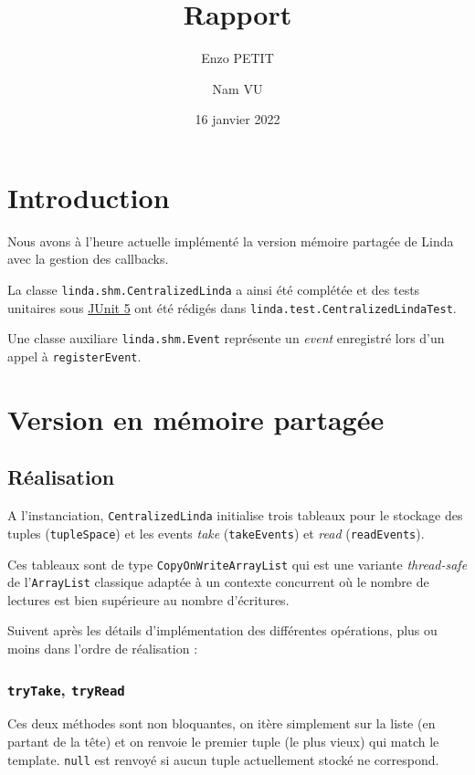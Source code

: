 \documentclass[headings=standardclasses,parskip=half]{scrartcl}
\title{Rapport}
\subtitle{}
\author{Enzo PETIT \and Nam VU}
\date{16 janvier 2022}
\begin{document}
\maketitle

\newpage

\tableofcontents

\newpage

\section{Introduction}

Nous avons à l'heure actuelle implémenté la version mémoire partagée
de Linda avec la gestion des callbacks.

La classe \texttt{linda.shm.CentralizedLinda} a ainsi été complétée et
des tests unitaires sous \href{https://junit.org/junit5/}{JUnit 5}
ont été rédigés dans \texttt{linda.test.CentralizedLindaTest}.

Une classe auxiliare \texttt{linda.shm.Event} représente un
\emph{event} enregistré lors d'un appel à \texttt{registerEvent}.

\section{Version en mémoire partagée}

\subsection{Réalisation}

A l'instanciation, \texttt{CentralizedLinda} initialise trois tableaux
pour le stockage des tuples (\texttt{tupleSpace}) et les events
\emph{take} (\texttt{takeEvents}) et \emph{read} (\texttt{readEvents}).

Ces tableaux sont de type \texttt{CopyOnWriteArrayList} qui est une
variante \emph{thread-safe} de l'\texttt{ArrayList} classique adaptée
à un contexte concurrent où le nombre de lectures est bien supérieure
au nombre d'écritures.

Suivent après les détails d'implémentation des différentes opérations,
plus ou moins dans l'ordre de réalisation :

\subsubsection{\texttt{tryTake}, \texttt{tryRead}}

Ces deux méthodes sont non bloquantes, on itère simplement sur la liste
(en partant de la tête) et on renvoie le premier tuple (le plus vieux)
qui match le template. \texttt{null} est renvoyé si aucun tuple
actuellement stocké ne correspond.
\end{document}

